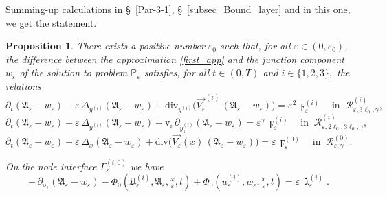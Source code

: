\documentclass[reqno]{amsart}            %
\newtheorem{proposition}{Proposition}[section]
\numberwithin{equation}{section}
\begin{document}
	Summing-up  calculations in \S~\ref{Par-3-1}, \S~\ref{subsec_Bound_layer}  and in this one, we get the statement.
	
	
	\begin{proposition}\label{Prop-3-1}
		There exists a positive number $\varepsilon_0$ such that, for all 
		$\varepsilon\in(0,\varepsilon_0)$, the difference between the approximation 
		\eqref{first_app} and the junction component $w_\varepsilon$ of the solution to 
		problem $\mathbb{P}_\varepsilon$ satisfies, for all $t\in(0,T)$ and $i\in\{1,2,3\},$ the relations
		\begin{equation}\label{dif_3}
			\partial_t(\mathfrak{A}_\varepsilon - w_\varepsilon)
			- \varepsilon\,\Delta_{y^{(i)}}(\mathfrak{A}_\varepsilon - w_\varepsilon)
			+ \mathrm{div}_{y^{(i)}}\!\big(\overrightarrow{V_\varepsilon}^{(i)}\,
			(\mathfrak{A}_\varepsilon - w_\varepsilon)\big)
			= \varepsilon^2\,\digamma^{(i)}_\varepsilon
			\quad\text{in } \ \mathcal{R}^{(i)}_{\varepsilon,3\ell_0,\gamma},
		\end{equation}
		\begin{equation}\label{dif_2}
			\partial_t(\mathfrak{A}_\varepsilon - w_\varepsilon)
			- \varepsilon\,\Delta_{y^{(i)}}(\mathfrak{A}_\varepsilon - w_\varepsilon)
			+ \mathrm{v}_i\,\partial_{y^{(i)}_1}(\mathfrak{A}_\varepsilon - w_\varepsilon)
			= \varepsilon^{\gamma}\,\digamma^{(i)}_\varepsilon
			\quad\text{in } \ \mathcal{R}^{(i)}_{\varepsilon,2\ell_0,3\ell_0,\gamma},
		\end{equation}
		\begin{equation}\label{dif_1}
			\partial_t(\mathfrak{A}_\varepsilon - w_\varepsilon)
			- \varepsilon\,\Delta_x(\mathfrak{A}_\varepsilon - w_\varepsilon)
			+ \mathrm{div}\!\big(\overrightarrow{V_\varepsilon}(x)\,
			(\mathfrak{A}_\varepsilon - w_\varepsilon)\big)
			= \varepsilon\,\digamma^{(0)}_\varepsilon
			\quad\text{in } \ \mathcal{R}^{(0)}_{\varepsilon,\gamma}.
		\end{equation}
		
		On the node interface $\Gamma^{(i,0)}_\varepsilon$ we have
		\begin{equation}\label{bc_1+}
			-\,\partial_{\boldsymbol{\nu}_\varepsilon}(\mathfrak{A}_\varepsilon - w_\varepsilon)
			- \Phi_0\!\left(\mathfrak{U}^{(i)}_\varepsilon,\mathfrak{A}_\varepsilon,
			\tfrac{x}{\varepsilon},t\right)
			+ \Phi_0\!\left(u^{(i)}_\varepsilon,w_\varepsilon,
			\tfrac{x}{\varepsilon},t\right)
			= \varepsilon\,\gimel^{(i)}_\varepsilon.
		\end{equation}
		

\end{proposition}
\end{document}
